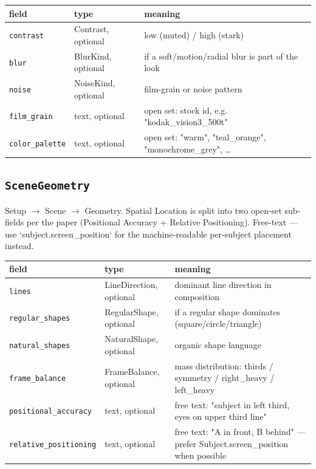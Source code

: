 \begin{longtable}{@{}R{0.24\textwidth}R{0.21\textwidth}R{0.49\textwidth}@{}}
\toprule \textbf{field} & \textbf{type} & \textbf{meaning} \\ \midrule
\endhead
\texttt{contrast} & Contrast, optional & low (muted) /\allowbreak{} high (stark) \\
\texttt{blur} & BlurKind, optional & if a soft/\allowbreak{}motion/\allowbreak{}radial blur is part of the look \\
\texttt{noise} & NoiseKind, optional & film-grain or noise pattern \\
\texttt{film\_\allowbreak grain} & text, optional & open set: stock id, e.g. "kodak\_\allowbreak vision3\_\allowbreak 500t" \\
\texttt{color\_\allowbreak palette} & text, optional & open set: "warm", "teal\_\allowbreak orange", "monochrome\_\allowbreak grey", \ldots{} \\
\bottomrule
\end{longtable}

\subsection*{\texttt{SceneGeometry}}
\noindent Setup $\to$ Scene $\to$ Geometry. Spatial Location is split into two open-set sub-fields per the paper (Positional Accuracy + Relative Positioning). Free-text ---\allowbreak{} use `subject.screen\_\allowbreak position` for the machine-readable per-subject placement instead.

\begin{longtable}{@{}R{0.24\textwidth}R{0.21\textwidth}R{0.49\textwidth}@{}}
\toprule \textbf{field} & \textbf{type} & \textbf{meaning} \\ \midrule
\endhead
\texttt{lines} & LineDirection, optional & dominant line direction in composition \\
\texttt{regular\_\allowbreak shapes} & RegularShape, optional & if a regular shape dominates (square/\allowbreak{}circle/\allowbreak{}triangle) \\
\texttt{natural\_\allowbreak shapes} & NaturalShape, optional & organic shape language \\
\texttt{frame\_\allowbreak balance} & FrameBalance, optional & mass distribution: thirds /\allowbreak{} symmetry /\allowbreak{} right\_\allowbreak heavy /\allowbreak{} left\_\allowbreak heavy \\
\texttt{positional\_\allowbreak accuracy} & text, optional & free text: "subject in left third, eyes on upper third line" \\
\texttt{relative\_\allowbreak positioning} & text, optional & free text: "A in front, B behind" ---\allowbreak{} prefer Subject.screen\_\allowbreak position when possible \\
\bottomrule
\end{longtable}

